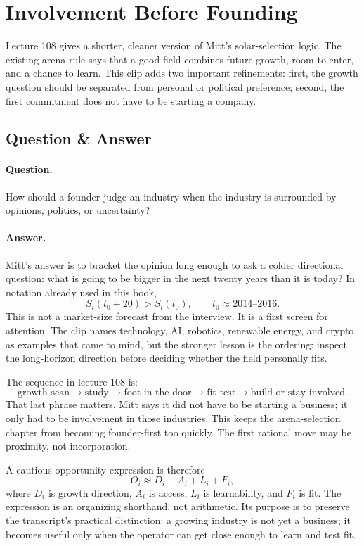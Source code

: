 \documentclass[11pt,oneside]{book}
\begin{document}
\section{Involvement Before Founding}

Lecture 108 gives a shorter, cleaner version of Mitt's solar-selection logic. The existing arena rule says that a good field combines future growth, room to enter, and a chance to learn. This clip adds two important refinements: first, the growth question should be separated from personal or political preference; second, the first commitment does not have to be starting a company.

\subsection{Question \& Answer}

\paragraph{Question.}
How should a founder judge an industry when the industry is surrounded by opinions, politics, or uncertainty?

\paragraph{Answer.}
Mitt's answer is to bracket the opinion long enough to ask a colder directional question: what is going to be bigger in the next twenty years than it is today? In notation already used in this book,
\[
S_i(t_0+20)>S_i(t_0),
\qquad
t_0\approx 2014\text{--}2016.
\]
This is not a market-size forecast from the interview. It is a first screen for attention. The clip names technology, AI, robotics, renewable energy, and crypto as examples that came to mind, but the stronger lesson is the ordering: inspect the long-horizon direction before deciding whether the field personally fits.

The sequence in lecture 108 is:
\[
\text{growth scan}
\longrightarrow
\text{study}
\longrightarrow
\text{foot in the door}
\longrightarrow
\text{fit test}
\longrightarrow
\text{build or stay involved}.
\]
That last phrase matters. Mitt says it did not have to be starting a business; it only had to be involvement in those industries. This keeps the arena-selection chapter from becoming founder-first too quickly. The first rational move may be proximity, not incorporation.

A cautious opportunity expression is therefore
\[
O_i
\approx
D_i+A_i+L_i+F_i,
\]
where \(D_i\) is growth direction, \(A_i\) is access, \(L_i\) is learnability, and \(F_i\) is fit. The expression is an organizing shorthand, not arithmetic. Its purpose is to preserve the transcript's practical distinction: a growing industry is not yet a business; it becomes useful only when the operator can get close enough to learn and test fit.
\end{document}
